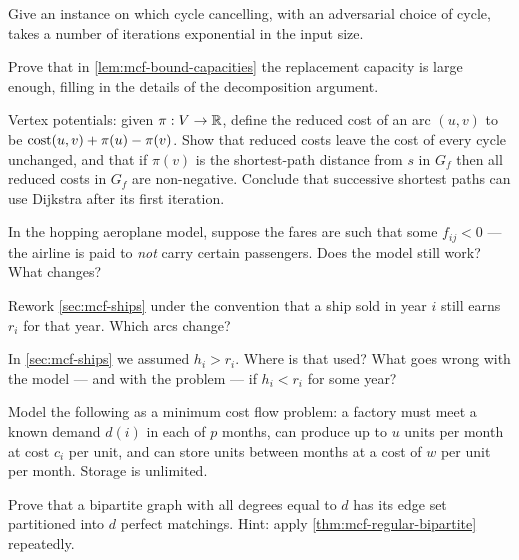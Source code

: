 \begin{exercise}
Give an instance on which cycle cancelling, with an adversarial choice of
cycle, takes a number of iterations exponential in the input size.
\end{exercise}

\begin{exercise}
Prove that in \cref{lem:mcf-bound-capacities} the replacement capacity is large
enough, filling in the details of the decomposition argument.
\end{exercise}

\begin{exercise}
Vertex potentials: given $\pi : V \to \mathbb{R}$, define the reduced cost of an arc
$(u,v)$ to be $\operatorname{cost}(u,v) + \pi(u) - \pi(v)$. Show that reduced costs leave the
cost of every cycle unchanged, and that if $\pi(v)$ is the shortest-path
distance from $s$ in $G_f$ then all reduced costs in $G_f$ are non-negative.
Conclude that successive shortest paths can use Dijkstra after its first
iteration.
\end{exercise}

\begin{exercise}
In the hopping aeroplane model, suppose the fares are such that some
$f_{ij} < 0$ --- the airline is paid to \emph{not} carry certain passengers.
Does the model still work? What changes?
\end{exercise}

\begin{exercise}
Rework \cref{sec:mcf-ships} under the convention that a ship sold in year $i$
still earns $r_i$ for that year. Which arcs change?
\end{exercise}

\begin{exercise}
In \cref{sec:mcf-ships} we assumed $h_i > r_i$. Where is that used? What goes
wrong with the model --- and with the problem --- if $h_i < r_i$ for some year?
\end{exercise}

\begin{exercise}
Model the following as a minimum cost flow problem: a factory must meet a known
demand $d(i)$ in each of $p$ months, can produce up to $u$ units per month at
cost $c_i$ per unit, and can store units between months at a cost of $w$ per
unit per month. Storage is unlimited.
\end{exercise}

\begin{exercise}
Prove that a bipartite graph with all degrees equal to $d$ has its edge set
partitioned into $d$ perfect matchings. Hint: apply
\cref{thm:mcf-regular-bipartite} repeatedly.
\end{exercise}

